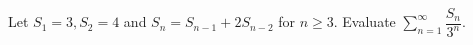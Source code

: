 Let $ S_1=3,S_2=4 $ and $ S_n=S_{n-1}+2S_{n-2}$ for $ n\ge3 $. Evaluate $\sum_{n=1}^{\infty}\dfrac{S_n}{3^n}$.
